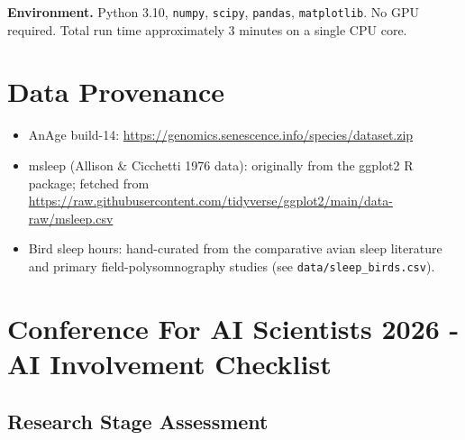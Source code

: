 \documentclass{article}
\begin{document}
\textbf{Environment.} Python 3.10, \texttt{numpy}, \texttt{scipy}, \texttt{pandas},
\texttt{matplotlib}. No GPU required. Total run time approximately 3 minutes on a
single CPU core.

\section{Data Provenance}
\label{app:data}

\begin{itemize}
  \item AnAge build-14: \url{https://genomics.senescence.info/species/dataset.zip}
  \item msleep (Allison \& Cicchetti 1976 data): originally from the ggplot2 R package;
    fetched from \url{https://raw.githubusercontent.com/tidyverse/ggplot2/main/data-raw/msleep.csv}
  \item Bird sleep hours: hand-curated from the comparative avian sleep literature and
    primary field-polysomnography studies (see \texttt{data/sleep\_birds.csv}).
\end{itemize}


\newpage

\section*{Conference For AI Scientists 2026 - AI Involvement Checklist}
\label{checklist_ai_involvement}

\subsection*{Research Stage Assessment}
\end{document}
